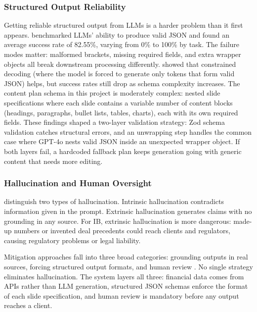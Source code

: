 \subsubsection{Structured Output Reliability}

Getting reliable structured output from LLMs is a harder problem than it first appears. \textcite{shorten2024} benchmarked LLMs' ability to produce valid JSON and found an average success rate of 82.55\%, varying from 0\% to 100\% by task. The failure modes matter: malformed brackets, missing required fields, and extra wrapper objects all break downstream processing differently. \textcite{geng2025} showed that constrained decoding (where the model is forced to generate only tokens that form valid JSON) helps, but success rates still drop as schema complexity increases. The content plan schema in this project is moderately complex: nested slide specifications where each slide contains a variable number of content blocks (headings, paragraphs, bullet lists, tables, charts), each with its own required fields. These findings shaped a two-layer validation strategy: Zod schema validation catches structural errors, and an unwrapping step handles the common case where GPT-4o nests valid JSON inside an unexpected wrapper object. If both layers fail, a hardcoded fallback plan keeps generation going with generic content that needs more editing.

\subsubsection{Hallucination and Human Oversight}

\textcite{huang2024} distinguish two types of hallucination. Intrinsic hallucination contradicts information given in the prompt. Extrinsic hallucination generates claims with no grounding in any source. For IB, extrinsic hallucination is more dangerous: made-up numbers or invented deal precedents could reach clients and regulators, causing regulatory problems or legal liability.

Mitigation approaches fall into three broad categories: grounding outputs in real sources, forcing structured output formats, and human review \parencite{zhang2023hallucination,huang2024}. No single strategy eliminates hallucination. The system layers all three: financial data comes from APIs rather than LLM generation, structured JSON schemas enforce the format of each slide specification, and human review is mandatory before any output reaches a client.

